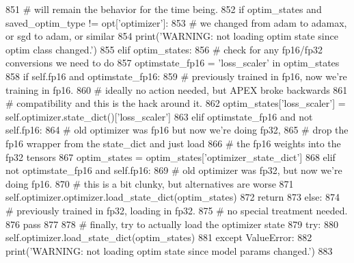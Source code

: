 \begin{DoxyCode}
851         \textcolor{comment}{# will remain the behavior for the time being.}
852         \textcolor{keywordflow}{if} optim\_states \textcolor{keywordflow}{and} saved\_optim\_type != opt[\textcolor{stringliteral}{'optimizer'}]:
853             \textcolor{comment}{# we changed from adam to adamax, or sgd to adam, or similar}
854             print(\textcolor{stringliteral}{'WARNING: not loading optim state since optim class changed.'})
855         \textcolor{keywordflow}{elif} optim\_states:
856             \textcolor{comment}{# check for any fp16/fp32 conversions we need to do}
857             optimstate\_fp16 = \textcolor{stringliteral}{'loss\_scaler'} \textcolor{keywordflow}{in} optim\_states
858             \textcolor{keywordflow}{if} self.fp16 \textcolor{keywordflow}{and} optimstate\_fp16:
859                 \textcolor{comment}{# previously trained in fp16, now we're training in fp16.}
860                 \textcolor{comment}{# ideally no action needed, but APEX broke backwards}
861                 \textcolor{comment}{# compatibility and this is the hack around it.}
862                 optim\_states[\textcolor{stringliteral}{'loss\_scaler'}] = self.optimizer.state\_dict()[\textcolor{stringliteral}{'loss\_scaler'}]
863             \textcolor{keywordflow}{elif} optimstate\_fp16 \textcolor{keywordflow}{and} \textcolor{keywordflow}{not} self.fp16:
864                 \textcolor{comment}{# old optimizer was fp16 but now we're doing fp32,}
865                 \textcolor{comment}{# drop the fp16 wrapper from the state\_dict and just load}
866                 \textcolor{comment}{# the fp16 weights into the fp32 tensors}
867                 optim\_states = optim\_states[\textcolor{stringliteral}{'optimizer\_state\_dict'}]
868             \textcolor{keywordflow}{elif} \textcolor{keywordflow}{not} optimstate\_fp16 \textcolor{keywordflow}{and} self.fp16:
869                 \textcolor{comment}{# old optimizer was fp32, but now we're doing fp16.}
870                 \textcolor{comment}{# this is a bit clunky, but alternatives are worse}
871                 self.optimizer.optimizer.load\_state\_dict(optim\_states)
872                 \textcolor{keywordflow}{return}
873             \textcolor{keywordflow}{else}:
874                 \textcolor{comment}{# previously trained in fp32, loading in fp32.}
875                 \textcolor{comment}{# no special treatment needed.}
876                 \textcolor{keywordflow}{pass}
877 
878             \textcolor{comment}{# finally, try to actually load the optimizer state}
879             \textcolor{keywordflow}{try}:
880                 self.optimizer.load\_state\_dict(optim\_states)
881             \textcolor{keywordflow}{except} ValueError:
882                 print(\textcolor{stringliteral}{'WARNING: not loading optim state since model params changed.'})
883 
\end{DoxyCode}
